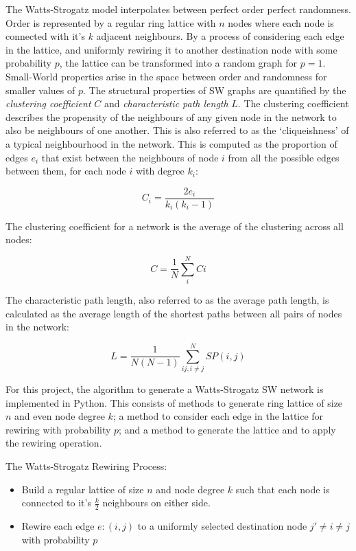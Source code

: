 \documentclass[
	a4paper, %
	10pt, %
	unnumberedsections, %
	twoside, %
]{LTJournalArticle}
\begin{document}
The Watts-Strogatz model interpolates between perfect order perfect randomness. Order is represented by a regular ring lattice with \(n\) nodes where each node is connected with it's \(k\) adjacent neighbours. By a process of considering each edge in the lattice, and uniformly rewiring it to another destination node with some probability \(p\), the lattice can be transformed into a random graph for \(p =1\). \\

Small-World properties arise in the space between order and randomness for smaller values of \(p\). The structural properties of SW graphs are quantified by the \emph{clustering coefficient} \(C\) and \emph{characteristic path length} \(L\). The clustering coefficient describes the propensity of the neighbours of any given node in the network to also be neighbours of one another. This is also referred to as the `cliqueishness' of a typical neighbourhood in the network. This is computed as the proportion of edges \(e_{i}\) that exist between the neighbours of node \(i\) from all the possible edges between them, for each node \(i\) with degree \(k_{i}\): 

\begin{equation}
	C_{i} = \frac{2e_{i}}{k_{i}(k_{i} - 1)}
	\label{eq:clustering}
\end{equation}

The clustering coefficient for a network is the average of the clustering across all nodes:

\begin{equation}
	C = \frac{1}{N} \sum_{i}^{N} Ci
	\label{eq:cc}
\end{equation}

The characteristic path length, also referred to as the average path length, is calculated as the average length of the shortest paths between all pairs of nodes in the network: 

\begin{equation}
	L = \frac{1}{N(N - 1)} \sum_{ij, i \neq j}^{N} SP(i, j)
	\label{eq:lp} 
\end{equation}

For this project, the algorithm to generate a Watts-Strogatz SW network is implemented in Python. This consists of methods to generate ring lattice of size \(n\) and even node degree \(k\); a method to consider each edge in the lattice for rewiring with probability \(p\); and a method to generate the lattice and to apply the rewiring operation. 

The Watts-Strogatz Rewiring Process:
\begin{itemize}
	\item Build a regular lattice of size \(n\) and node degree \(k\) such that each node is connected to it's \(\frac{k}{2}\) neighbours on either side.
	\item Rewire each edge \(e: (i, j)\) to a uniformly selected destination node \(j' \neq i \neq j\)  with probability \(p\) 
\end{itemize}
\end{document}
